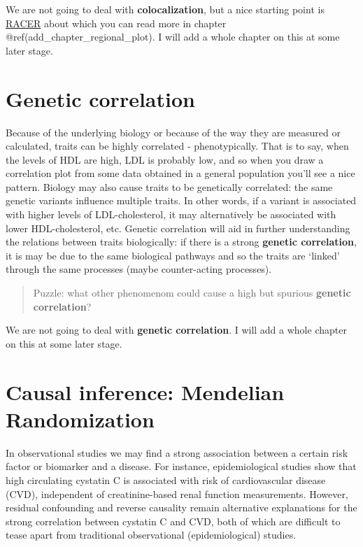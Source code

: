 \documentclass[
]{book}
\begin{document}
We are not going to deal with \textbf{colocalization}, but a nice starting point is \href{https://github.com/oliviasabik/RACER}{RACER} about which you can read more in chapter @ref(add\_chapter\_regional\_plot). I will add a whole chapter on this at some later stage.

\hypertarget{genetic-correlation}{%
\section{Genetic correlation}\label{genetic-correlation}}

Because of the underlying biology or because of the way they are measured or calculated, traits can be highly correlated - phenotypically. That is to say, when the levels of HDL are high, LDL is probably low, and so when you draw a correlation plot from some data obtained in a general population you'll see a nice pattern. Biology may also cause traits to be genetically correlated: the same genetic variants influence multiple traits. In other words, if a variant is associated with higher levels of LDL-cholesterol, it may alternatively be associated with lower HDL-cholesterol, etc. Genetic correlation will aid in further understanding the relations between traits biologically: if there is a strong \textbf{genetic correlation}, it is may be due to the same biological pathways and so the traits are `linked' through the same processes (maybe counter-acting processes).

\begin{quote}
Puzzle: what other phenomenom could cause a high but spurious \textbf{genetic correlation}?
\end{quote}

We are not going to deal with \textbf{genetic correlation}. I will add a whole chapter on this at some later stage.

\hypertarget{causal-inference-mendelian-randomization}{%
\section{Causal inference: Mendelian Randomization}\label{causal-inference-mendelian-randomization}}

In observational studies we may find a strong association between a certain risk factor or biomarker and a disease. For instance, epidemiological studies show that high circulating cystatin C is associated with risk of cardiovascular disease (CVD), independent of creatinine-based renal function measurements\citep{vanderlaan2016}. However, residual confounding and reverse causality remain alternative explanations for the strong correlation between cystatin C and CVD, both of which are difficult to tease apart from traditional observational (epidemiological) studies.
\end{document}
